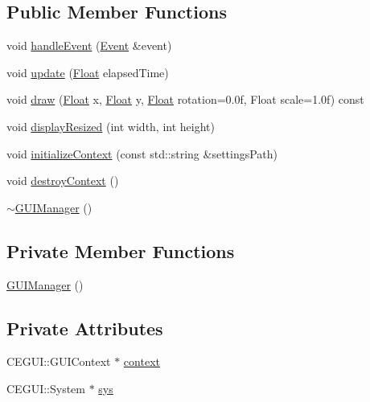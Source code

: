 \subsection*{Public Member Functions}
\begin{DoxyCompactItemize}
\item 
void \hyperlink{classZeta_1_1GUIManager_a2d19f5a925049f6ce166e223442834c6}{handle\+Event} (\hyperlink{classZeta_1_1Event}{Event} \&event)
\item 
void \hyperlink{classZeta_1_1GUIManager_af33fc7fef32ac295497ca989b9e90a34}{update} (\hyperlink{namespaceZeta_a1e0a1265f9b3bd3075fb0fabd39088ba}{Float} elapsed\+Time)
\item 
void \hyperlink{classZeta_1_1GUIManager_ad7015380f8d03224a633b3a644087b29}{draw} (\hyperlink{namespaceZeta_a1e0a1265f9b3bd3075fb0fabd39088ba}{Float} x, \hyperlink{namespaceZeta_a1e0a1265f9b3bd3075fb0fabd39088ba}{Float} y, \hyperlink{namespaceZeta_a1e0a1265f9b3bd3075fb0fabd39088ba}{Float} rotation=0.\+0f, Float scale=1.\+0f) const 
\item 
void \hyperlink{classZeta_1_1GUIManager_ad36444b67147a64dead1f1a428b1bba2}{display\+Resized} (int width, int height)
\item 
void \hyperlink{classZeta_1_1GUIManager_a48a024b48e5abc5a945a22b5e85fc482}{initialize\+Context} (const std\+::string \&settings\+Path)
\item 
void \hyperlink{classZeta_1_1GUIManager_add2c26747f77b95ffacf62a7480faeac}{destroy\+Context} ()
\item 
\hyperlink{classZeta_1_1GUIManager_a8f92825b38fb25547d86b638880ba634}{$\sim$\+G\+U\+I\+Manager} ()
\end{DoxyCompactItemize}
\subsection*{Private Member Functions}
\begin{DoxyCompactItemize}
\item 
\hyperlink{classZeta_1_1GUIManager_a79d3d3506109b9d4039f26f2ba87fbba}{G\+U\+I\+Manager} ()
\end{DoxyCompactItemize}
\subsection*{Private Attributes}
\begin{DoxyCompactItemize}
\item 
C\+E\+G\+U\+I\+::\+G\+U\+I\+Context $\ast$ \hyperlink{classZeta_1_1GUIManager_a3b8922a1be0f73ace046033806c6e142}{context}
\item 
C\+E\+G\+U\+I\+::\+System $\ast$ \hyperlink{classZeta_1_1GUIManager_a670884c848cec41b709da2643da97772}{sys}
\end{DoxyCompactItemize}
